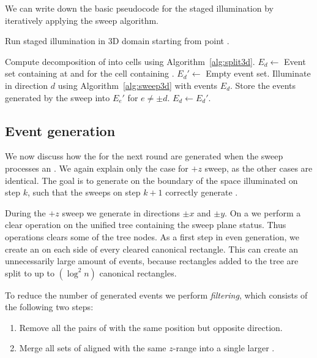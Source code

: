 \documentclass[english,gradu]{tktltiki2018}
\begin{document}
We can write down the basic pseudocode for the staged illumination by iteratively applying the sweep algorithm.

\begin{alg}\label{alg:minlink3d}
Run staged illumination in 3D domain \fspace starting from point \spt.
\begin{algorithmic}
\State Compute decomposition of \fspace into cells using Algorithm~\ref{alg:split3d}.
	\State $E_d\gets$ Event set containing \addE at \spt and \cellE for the cell containing \spt.
\EndFor
{}
		\State $E_d'\gets$ Empty event set.
	\EndFor
		\State Illuminate in direction $d$ using Algorithm~\ref{alg:sweep3d} with events $E_d$.
		\State Store the events generated by the sweep into $E_e'$ for $e\neq\pm d$.
	\EndFor
		\State $E_d\gets E_d'$.
	\EndFor
\EndWhile
\end{algorithmic}
\end{alg}

\subsection{Event generation}\label{sec:evtgen}

We now discuss how the \addEs for the next round are generated when the sweep processes an \obsE.
We again explain only the case for $+z$ sweep, as the other cases are identical.
The goal is to generate \addEs on the boundary of the space illuminated on step $k$, such that the sweeps on step $k+1$ correctly generate .

During the $+z$ sweep we generate \addEs in directions $\pm x$ and $\pm y$.
On a \obsE we perform a clear operation on the unified tree containing the sweep plane status.
Thus operations clears some of the tree nodes.
As a first step in even generation, we create an \addEs on each side of every cleared canonical rectangle.
This can create an unnecessarily large amount of events, because rectangles added to the tree are split to up to $(\log^2 n)$ canonical rectangles.

To reduce the number of generated events we perform \emph{filtering}, which consists of the following two steps:
\begin{enumerate}
\item Remove all the pairs of \addEs with the same position but opposite direction.
\item Merge all sets of aligned \addEs with the same $z$-range into a single larger \addE.
\end{enumerate}
\end{document}
